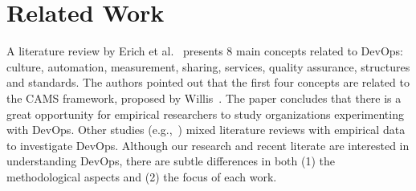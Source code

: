 \section{Related Work} \label{sec:related_work}


A literature review by Erich et al.~\cite{cooperation_dev_ops_esem_2014} presents 8
main concepts related to DevOps: culture, automation, measurement, sharing,
services, quality assurance, structures and standards. The authors pointed out
that the first four concepts are
related to the CAMS framework, proposed by Willis~\cite{what_devops_means_2010}.
The paper concludes that there is a great opportunity for empirical researchers
to study organizations experimenting with DevOps.
Other studies (e.g.,~\cite{devops_a_definition_xp_15,dimensions_of_devops_xp_15,extending_dimensions_icsea_16,characterizing_devops_sbes_2016,qualitative_devops_journalsw_17})
mixed literature reviews with empirical data to investigate DevOps.
Although our research and recent literate are interested in understanding DevOps,
there are subtle differences in both (1) the methodological aspects and (2) the focus
of each work.




